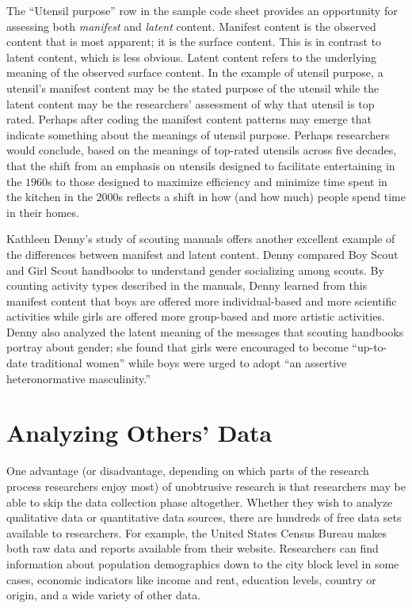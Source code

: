 The ``Utensil purpose'' row in the sample code sheet provides an opportunity for assessing both \textit{manifest} and \textit{latent} content. Manifest content is the observed content that is most apparent; it is the surface content. This is in contrast to latent content, which is less obvious. Latent content refers to the underlying meaning of the observed surface content. In the example of utensil purpose, a utensil's manifest content may be the stated purpose of the utensil while the latent content may be the researchers' assessment of why that utensil is top rated. Perhaps after coding the manifest content patterns may emerge that indicate something about the meanings of utensil purpose. Perhaps researchers would conclude, based on the meanings of top-rated utensils across five decades, that the shift from an emphasis on utensils designed to facilitate entertaining in the $ 1960 $s to those designed to maximize efficiency and minimize time spent in the kitchen in the $ 2000 $s reflects a shift in how (and how much) people spend time in their homes.

Kathleen Denny's\cite{denny2011gender} study of scouting manuals offers another excellent example of the differences between manifest and latent content. Denny compared Boy Scout and Girl Scout handbooks to understand gender socializing among scouts. By counting activity types described in the manuals, Denny learned from this manifest content that boys are offered more individual-based and more scientific activities while girls are offered more group-based and more artistic activities. Denny also analyzed the latent meaning of the messages that scouting handbooks portray about gender; she found that girls were encouraged to become ``up-to-date traditional women'' while boys were urged to adopt ``an assertive heteronormative masculinity.''

\section{Analyzing Others' Data}

One advantage (or disadvantage, depending on which parts of the research process researchers enjoy most) of unobtrusive research is that researchers may be able to skip the data collection phase altogether. Whether they wish to analyze qualitative data or quantitative data sources, there are hundreds of free data sets available to researchers. For example, the United States Census Bureau makes both raw data and reports available from their website. Researchers can find information about population demographics down to the city block level in some cases, economic indicators like income and rent, education levels, country or origin, and a wide variety of other data. 

